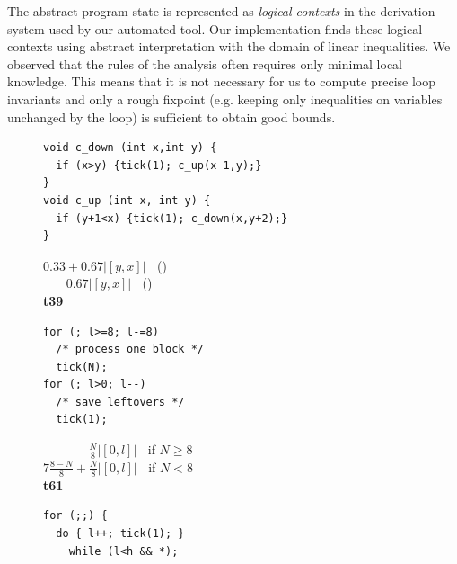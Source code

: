 \documentclass[nocopyrightspace,preprint,pldi]{sigplanconf-pldi15}
\newcommand{\ifshort}[2]{\ifx\fullversion\undefined{#1}\else{#2}\fi}
\begin{document}
The abstract program state is represented as \emph{logical contexts} in the
derivation system used by our automated tool.
Our implementation finds these logical contexts using abstract
interpretation with the domain of linear inequalities.  We observed that
the rules of the analysis often requires only minimal local knowledge.
This means that it is not necessary for us to compute precise loop
invariants and only a rough fixpoint (e.g. keeping only inequalities on
variables unchanged by the loop) is sufficient to obtain good bounds.



\begin{figure}
  \centering
\ifshort{\vspace{-.3cm}
\hspace{-0.4cm}}{}
  \begin{minipage}[b]{7cm}
    \begin{center}
   \begin{lstlisting}[]
void c_down (int x,int y) {
  if (x>y) {tick(1); c_up(x-1,y);}
}
void c_up (int x, int y) {
  if (y+1<x) {tick(1); c_down(x,y+2);}
}
   \end{lstlisting}
\vspace{-2.7ex}
$0.33 + 0.67 |[y,x]|\;\;$ ()\\
$\;\;\;\;\;\;\,0.67 |[y,x]|\;\;$ ()
\\[.4\baselineskip]
      {\bf t39}
    \end{center}
  \end{minipage}
%
\hfill
%
  \begin{minipage}[b]{5cm}
    \begin{center}
   \begin{lstlisting}
for (; l>=8; l-=8)
  /* process one block */
  tick(N);
for (; l>0; l--)
  /* save leftovers */
  tick(1);
   \end{lstlisting}
\vspace{-2.8ex}
$\;\;\;\;\;\;\;\;\;\;\;\;\;\frac{N}{8} |[0,l]|\;\;$ if $N \geq 8$\\
$7\frac{8-N}{8} + \frac{N}{8}|[0,l]|\;\;$ if $N < 8$
\\[.4\baselineskip]
      {\bf t61}
    \end{center}
  \end{minipage}
%
\hfill
%
  \begin{minipage}[b]{5.5cm}
    \begin{center}
\begin{lstlisting}
for (;;) {
  do { l++; tick(1); }
    while (l<h && *);

\end{lstlisting}
\end{center}
\end{minipage}
\end{figure}
\end{document}
